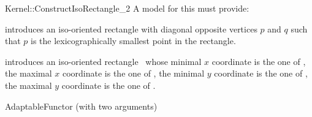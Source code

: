 \begin{ccRefFunctionObjectConcept}{Kernel::ConstructIsoRectangle_2}
A model for this must provide:


            {introduces an iso-oriented rectangle  with diagonal
             opposite vertices $p$ and $q$ such that $p$ is the
             lexicographically smallest point in the rectangle.}

            {introduces an iso-oriented rectangle \ccVar\ whose
             minimal $x$ coordinate is the one of , the
             maximal $x$ coordinate is the one of , the
             minimal $y$ coordinate is the one of , the
             maximal $y$ coordinate is the one of .}

\ccRefines
AdaptableFunctor (with two arguments)

\ccSeeAlso
{} \\

\end{ccRefFunctionObjectConcept}
